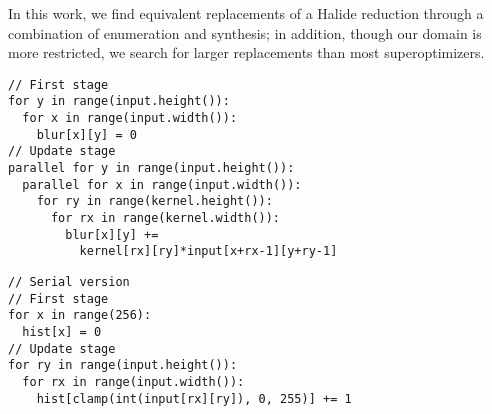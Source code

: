 In this work, we find equivalent replacements of a Halide reduction through a combination of enumeration and synthesis; in addition, though our domain is more restricted, we search for larger replacements than most superoptimizers.

\begin{lstlisting}[caption={Convolution blur kernel is easily parallelizable across \code{Var} $x$ adn $y$.}, label={lst:blur_loopness}]
// First stage
for y in range(input.height()):
  for x in range(input.width()):
    blur[x][y] = 0
// Update stage
parallel for y in range(input.height()):
  parallel for x in range(input.width()):
    for ry in range(kernel.height()):
      for rx in range(kernel.width()):    
        blur[x][y] += 
          kernel[rx][ry]*input[x+rx-1][y+ry-1] 
\end{lstlisting}

\begin{lstlisting}[caption={Histogram of an image is hard to parallelize since its update stage does not involve \code{RVar}s.}, label={lst:histogram_loopness}]
// Serial version
// First stage
for x in range(256):
  hist[x] = 0
// Update stage
for ry in range(input.height()):
  for rx in range(input.width()):
    hist[clamp(int(input[rx][ry]), 0, 255)] += 1
\end{lstlisting}
